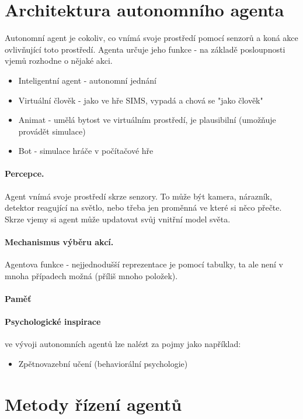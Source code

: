 \documentclass[a4paper]{article}      %
\begin{document}
\section{Architektura autonomního agenta}
Autonomní agent je cokoliv, co vnímá svoje prostředí pomocí senzorů a koná akce ovlivňující toto prostředí.
Agenta určuje jeho funkce - na základě posloupnosti vjemů rozhodne o nějaké akci.
\begin{itemize}
\item Inteligentní agent - autonomní jednání
\item Virtuální člověk - jako ve hře SIMS, vypadá a chová se "jako člověk"
\item Animat - umělá bytost ve virtuálním prostředí, je plausibilní (umožňuje provádět simulace)
\item Bot - simulace hráče v počítačové hře
\end{itemize}

\paragraph{Percepce.} Agent vnímá svoje prostředí skrze senzory. To může být kamera, nárazník, detektor reagující na světlo, nebo třeba
jen proměnná ve které si něco přečte. Skrze vjemy si agent může updatovat svůj vnitřní model světa.

\paragraph{Mechanismus výběru akcí.} Agentova funkce - nejjednodušší reprezentace je pomocí tabulky,
ta ale není v mnoha případech možná (příliš mnoho položek).

\paragraph{Paměť}

\paragraph{Psychologické inspirace}
ve vývoji autonomních agentů lze nalézt za pojmy jako například:
\begin{itemize}
\item Zpětnovazební učení (behaviorální psychologie)
\end{itemize}


\section{Metody řízení agentů}
\end{document}

